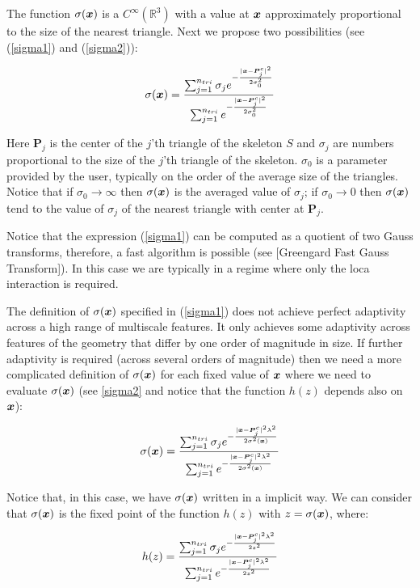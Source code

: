 \documentclass[11pt]{article}
\numberwithin{equation}{section}
\newcommand{\vct}{\vectorsym}
\newcommand\bx{\vct{x}}
\newcommand\bP{\boldsymbol P}
\begin{document}
The function $\sigma(\bx)$ is a $C^{\infty}(\mathbb{R}^3)$ with a value at $\bx$ approximately proportional to the size of the nearest triangle. Next we propose two possibilities (see (\ref{sigma1}) and (\ref{sigma2})):

\begin{equation}\label{sigma1}
\sigma(\bx)=\frac{\sum_{j=1}^{n_{tri}}\sigma_je^{- \frac{|\bx-\bP_j^c|^2}{2\sigma^2_0}}}{\sum_{j=1}^{n_{tri}}e^{-\frac{|\bx-\bP_j^c|^2}{2\sigma^2_0}}}
\end{equation}

Here $\bP_j$ is the center of the $j$'th triangle of the skeleton $\mathit{S}$ and $\sigma_j$ are numbers proportional to the size of the $j$'th triangle of the skeleton. $\sigma_0$ is a parameter provided by the user, typically on the order of the average size of the triangles. Notice that if $\sigma_0\rightarrow \infty$ then $\sigma(\bx)$ is the averaged value of $\sigma_j$; if $\sigma_0\rightarrow 0$ then $\sigma(\bx)$ tend to the value of $\sigma_j$ of the nearest triangle with center at $\bP_j$.

Notice that the expression (\ref{sigma1}) can be computed as a quotient of two Gauss transforms, therefore, a fast algorithm is possible (see [Greengard Fast Gauss Transform]). In this case we are typically in a regime where only the loca interaction is required.

The definition of $\sigma(\bx)$ specified in (\ref{sigma1}) does not achieve perfect adaptivity across a high range of multiscale features. It only achieves some adaptivity across features of the geometry that differ by one order of magnitude in size. If further adaptivity is required (across several orders of magnitude) then we need a more complicated definition of $\sigma(\bx)$ for each fixed value of $\bx$ where we need to evaluate $\sigma(\bx)$ (see \ref{sigma2} and notice that the function $h(z)$ depends also on $\bx$):

\begin{equation}\label{sigma2}
\sigma(\bx)=\frac{\sum_{j=1}^{n_{tri}}\sigma_je^{-\frac{|\bx-\bP_j^c|^2 \lambda^2}{2\sigma^2(\bx)}}}{\sum_{j=1}^{n_{tri}}e^{-\frac{|\bx-\bP_j^c|^2 \lambda^2}{2\sigma^2(\bx)}}}
\end{equation}

Notice that, in this case, we have $\sigma(\bx)$ written in a implicit way. We can consider that $\sigma(\bx)$ is the fixed point of the function $h(z)$ with $z=\sigma(\bx)$, where:

\begin{equation}\label{sigma2}
h(z)=\frac{\sum_{j=1}^{n_{tri}}\sigma_je^{-\frac{|\bx-\bP_j^c|^2 \lambda^2}{2z^2}}}{\sum_{j=1}^{n_{tri}}e^{-\frac{|\bx-\bP_j^c|^2 \lambda^2}{2z^2}}}
\end{equation}
\end{document}
